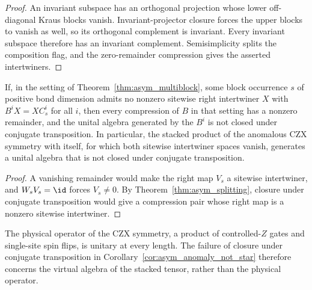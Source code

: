 \begin{proof}
    \leanok
    An invariant subspace has an orthogonal projection whose lower
    off-diagonal Kraus blocks vanish. Invariant-projector closure forces
    the upper blocks to vanish as well, so its orthogonal complement is
    invariant. Every invariant subspace therefore has an invariant
    complement. Semisimplicity splits the composition flag, and the
    zero-remainder compression gives the asserted intertwiners.
\end{proof}

\begin{corollary}
    \label{cor:asym_anomaly_not_star}
    \leanok
    If, in the setting of Theorem~\ref{thm:asym_multiblock}, some block
    occurrence $s$ of positive bond dimension admits no nonzero sitewise
    right intertwiner $X$ with $B^iX=XC_s^i$ for all $i$, then every
    compression of $B$ in that setting has a nonzero remainder, and the
    unital algebra generated by the $B^i$ is not closed under conjugate
    transposition. In particular, the
    stacked product of the anomalous CZX symmetry with itself, for which
    both sitewise intertwiner spaces vanish, generates a unital algebra
    that is not closed under conjugate transposition.
\end{corollary}

\begin{proof}
    \leanok
    A vanishing remainder would make the right map $V_s$ a sitewise
    intertwiner, and $W_sV_s=\id$ forces $V_s\neq0$.
    By Theorem~\ref{thm:asym_splitting}, closure under conjugate
    transposition would give a compression pair whose right map is a
    nonzero sitewise intertwiner.
\end{proof}

\begin{remark}
    \label{rem:asym_anomaly_unitary}
    The physical operator of the CZX symmetry, a product of controlled-$Z$
    gates and single-site spin flips, is unitary at every length. The
    failure of closure under conjugate transposition in
    Corollary~\ref{cor:asym_anomaly_not_star} therefore concerns the
    virtual algebra of the stacked tensor, rather than the physical operator.
\end{remark}

